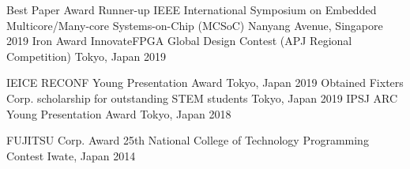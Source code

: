 

\begin{cvhonors}
  \cvhonor
    {Best Paper Award Runner-up} %
    {IEEE International Symposium on Embedded Multicore/Many-core Systems-on-Chip (MCSoC)} %
    {Nanyang Avenue, Singapore} %
    {2019} %
  \cvhonor
    {Iron Award} %
    {InnovateFPGA Global Design Contest (APJ Regional Competition)} %
    {Tokyo, Japan} %
    {2019} %
\end{cvhonors}


\begin{cvhonors}
  \cvact
    {IEICE RECONF Young Presentation Award} %
    {} %
    {Tokyo, Japan} %
    {2019} %
  \cvact
    {Obtained Fixters Corp. scholarship for outstanding STEM students} %
    {} 
    {Tokyo, Japan} %
    {2019} %
  \cvact
    {IPSJ ARC Young Presentation Award} %
    {} %
    {Tokyo, Japan} %
    {2018} %

  \cvhonor
    {FUJITSU Corp. Award} %
    {25th National College of Technology Programming Contest } %
    {Iwate, Japan} %
    {2014} %
    

\end{cvhonors}

